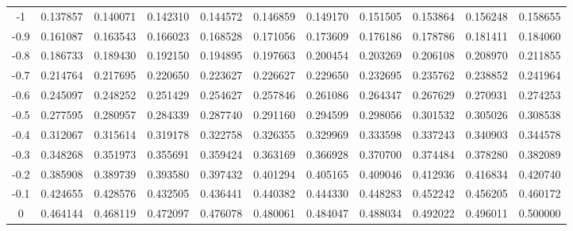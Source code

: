 \documentclass[
]{book}
\theoremstyle{definition}
\theoremstyle{definition}
\theoremstyle{definition}
\theoremstyle{definition}
\theoremstyle{remark}
\begin{document}
\begin{longtable}[]{@{}ccccccccccc@{}}
-1 & 0.137857 & 0.140071 & 0.142310 & 0.144572 & 0.146859 & 0.149170 & 0.151505 & 0.153864 & 0.156248 & 0.158655 \\
-0.9 & 0.161087 & 0.163543 & 0.166023 & 0.168528 & 0.171056 & 0.173609 & 0.176186 & 0.178786 & 0.181411 & 0.184060 \\
-0.8 & 0.186733 & 0.189430 & 0.192150 & 0.194895 & 0.197663 & 0.200454 & 0.203269 & 0.206108 & 0.208970 & 0.211855 \\
-0.7 & 0.214764 & 0.217695 & 0.220650 & 0.223627 & 0.226627 & 0.229650 & 0.232695 & 0.235762 & 0.238852 & 0.241964 \\
-0.6 & 0.245097 & 0.248252 & 0.251429 & 0.254627 & 0.257846 & 0.261086 & 0.264347 & 0.267629 & 0.270931 & 0.274253 \\
-0.5 & 0.277595 & 0.280957 & 0.284339 & 0.287740 & 0.291160 & 0.294599 & 0.298056 & 0.301532 & 0.305026 & 0.308538 \\
-0.4 & 0.312067 & 0.315614 & 0.319178 & 0.322758 & 0.326355 & 0.329969 & 0.333598 & 0.337243 & 0.340903 & 0.344578 \\
-0.3 & 0.348268 & 0.351973 & 0.355691 & 0.359424 & 0.363169 & 0.366928 & 0.370700 & 0.374484 & 0.378280 & 0.382089 \\
-0.2 & 0.385908 & 0.389739 & 0.393580 & 0.397432 & 0.401294 & 0.405165 & 0.409046 & 0.412936 & 0.416834 & 0.420740 \\
-0.1 & 0.424655 & 0.428576 & 0.432505 & 0.436441 & 0.440382 & 0.444330 & 0.448283 & 0.452242 & 0.456205 & 0.460172 \\
0 & 0.464144 & 0.468119 & 0.472097 & 0.476078 & 0.480061 & 0.484047 & 0.488034 & 0.492022 & 0.496011 & 0.500000 \\
\bottomrule
\end{longtable}
\end{document}

